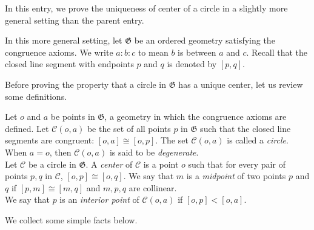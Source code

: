 \documentclass[12pt]{article}
\begin{document}

In this entry, we prove the uniqueness of center of a circle in a slightly more general setting than the parent entry.  

In this more general setting, let $\mathfrak{G}$ be an ordered geometry satisfying the congruence axioms. 
We  write $a:b:c$ to mean $b$ is between $a$ and $c$. Recall that the closed line segment
with endpoints $p$ and $q$ is denoted by $[p,q]$.

Before proving the property that a circle in $\mathfrak{G}$ has a unique center, 
let us review some definitions.

Let $o$ and $a$ be points in $\mathfrak{G}$, a geometry in which the congruence axioms are defined. 
Let $\mathscr{C}(o,a)$ be the set of all points $p$ in $\mathfrak{G}$ such that the 
closed line segments are congruent: $[o,a]\cong [o,p]$.  
The set $\mathscr{C}(o,a)$ is called a \emph{circle}.  When $a=o$, then $\mathscr{C}(o,a)$ is said to be \emph{degenerate}.  \\
Let $\mathscr{C}$ be a circle in $\mathfrak{G}$.  A \emph{center} of $\mathscr{C}$ is a point $o$ such that for every pair of points $p,q$ in $\mathscr{C}$, $[o,p] \cong [o,q]$.  
We say that $m$ is a \emph{midpoint} of two points $p$ and $q$
if $[p,m] \cong [m,q]$ and $m,p,q$ are collinear. \\
We say that $p$ is an \emph{interior point} of 
$\mathscr{C}(o,a)$ if $[o,p] < [o,a]$. 

We collect some simple facts below.
\end{document}
